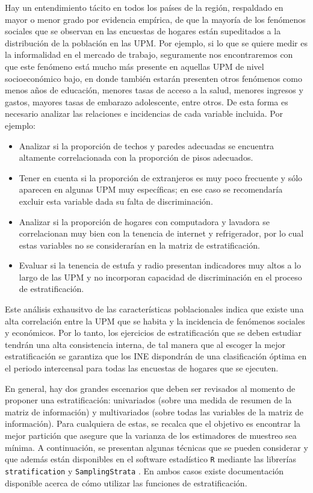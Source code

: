 \documentclass[
  12pt,
]{book}
\providecommand{\tightlist}{%
  \setlength{\itemsep}{0pt}\setlength{\parskip}{0pt}}
\begin{document}
Hay un entendimiento tácito en todos los países de la región, respaldado en mayor o menor grado por evidencia empírica, de que la mayoría de los fenómenos sociales que se observan en las encuestas de hogares están supeditados a la distribución de la población en las UPM. Por ejemplo, si lo que se quiere medir es la informalidad en el mercado de trabajo, seguramente nos encontraremos con que este fenómeno está mucho más presente en aquellas UPM de nivel socioeconómico bajo, en donde también estarán presenten otros fenómenos como menos años de educación, menores tasas de acceso a la salud, menores ingresos y gastos, mayores tasas de embarazo adolescente, entre otros. De esta forma es necesario analizar las relaciones e incidencias de cada variable incluida. Por ejemplo:

\begin{itemize}
\tightlist
\item
  Analizar si la proporción de techos y paredes adecuadas se encuentra altamente correlacionada con la proporción de pisos adecuados.
\item
  Tener en cuenta si la proporción de extranjeros es muy poco frecuente y sólo aparecen en algunas UPM muy específicas; en ese caso se recomendaría excluir esta variable dada su falta de discriminación.
\item
  Analizar si la proporción de hogares con computadora y lavadora se correlacionan muy bien con la tenencia de internet y refrigerador, por lo cual estas variables no se considerarían en la matriz de estratificación.
\item
  Evaluar si la tenencia de estufa y radio presentan indicadores muy altos a lo largo de las UPM y no incorporan capacidad de discriminación en el proceso de estratificación.
\end{itemize}

Este análisis exhausitvo de las características poblacionales indica que existe una alta correlación entre la UPM que se habita y la incidencia de fenómenos sociales y económicos. Por lo tanto, los ejercicios de estratificación que se deben estudiar tendrán una alta consistencia interna, de tal manera que al escoger la mejor estratificación se garantiza que los INE dispondrán de una clasificación óptima en el periodo intercensal para todas las encuestas de hogares que se ejecuten.

En general, hay dos grandes escenarios que deben ser revisados al momento de proponer una estratificación: univariados (sobre una medida de resumen de la matriz de información) y multivariados (sobre todas las variables de la matriz de información). Para cualquiera de estas, se recalca que el objetivo es encontrar la mejor partición que asegure que la varianza de los estimadores de muestreo sea mínima. A continuación, se presentan algunas técnicas que se pueden considerar y que además están disponibles en el software estadístico \texttt{R} mediante las librerías \texttt{stratification} \citep{Baillargeon_Rivest_2011} y \texttt{SamplingStrata} \citep{Barcaroli_2014}. En ambos casos existe documentación disponible acerca de cómo utilizar las funciones de estratificación.
\end{document}

